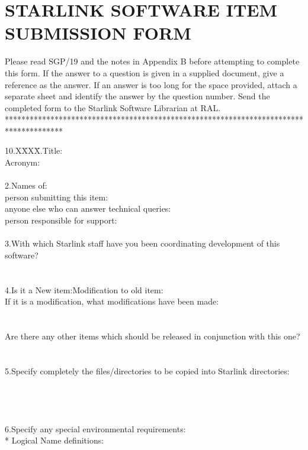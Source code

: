 \section {STARLINK SOFTWARE ITEM SUBMISSION FORM}
Please read SGP/19 and the notes in Appendix B before attempting to complete
this form.
If the answer to a question is given in a supplied document, give a reference
as the answer.
If an answer is too long for the space provided, attach a separate sheet and
identify the answer by the question number.
Send the completed form to the Starlink Software Librarian at RAL.
**************************************************************************************
\begin{tabbing}
10.X\=XXX\=.\>Title:\\
\>Acronym:\\
\\
2.\>Names of:\\
\>\>person submitting this item:\\
\>\>anyone else who can answer technical queries:\\
\>\>person responsible for support:\\
\\
3.\>With which Starlink staff have you been coordinating development of this
software?\\
\\
\\
4.\>Is it a New item:\hspace{30mm}Modification to old item:\\
\>If it is a modification, what modifications have been made:\\
\\
\\
\>Are there any other items which should be released in conjunction with this
one?\\
\\
\\
5.\>Specify completely the files/directories to be copied into Starlink
directories:\\
\\
\\
\\
\\
6.\>Specify any special environmental requirements:\\
\>* Logical Name definitions:\\
\\
\\
\\
\\

\end{tabbing}
